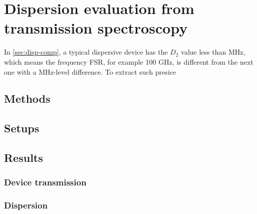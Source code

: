 
\chapter{Dispersion evaluation from transmission spectroscopy}

In \autoref{sec:disp-comp},  a typical dispersive device has the $ D_2 $ value less than MHz, which means the frequency FSR, for example 100 GHz, is different from the next one with a MHz-level difference. To extract such presice 

\section{Methods}

\section{Setups}


\section{Results}

\subsection{Device transmission}

\subsection{Dispersion}
